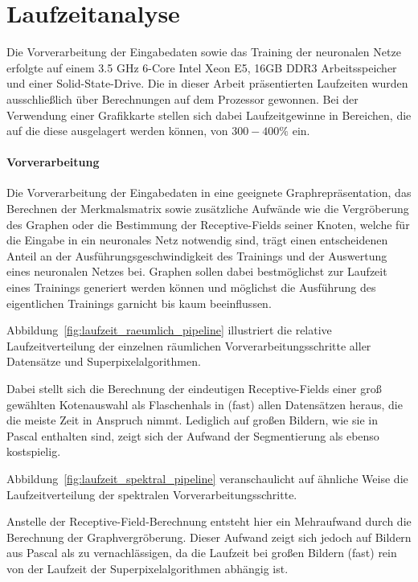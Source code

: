 \section{Laufzeitanalyse}
\label{laufzeitanalyse}

Die Vorverarbeitung der Eingabedaten sowie das Training der neuronalen Netze erfolgte auf einem 3.5 GHz 6-Core Intel Xeon E5, 16GB DDR3 Arbeitsspeicher und einer Solid-State-Drive.
Die in dieser Arbeit präsentierten Laufzeiten wurden ausschließlich über Berechnungen auf dem Prozessor gewonnen.
Bei der Verwendung einer Grafikkarte stellen sich dabei Laufzeitgewinne in Bereichen, die auf die diese ausgelagert werden können, von $300 - 400 \%$ ein.

\paragraph{Vorverarbeitung}

Die Vorverarbeitung der Eingabedaten in eine geeignete Graphrepräsentation, das Berechnen der Merkmalsmatrix sowie zusätzliche Aufwände wie die Vergröberung des Graphen oder die Bestimmung der Receptive-Fields seiner Knoten, welche für die Eingabe in ein neuronales Netz notwendig sind, trägt einen entscheidenen Anteil an der Ausführungsgeschwindigkeit des Trainings und der Auswertung eines neuronalen Netzes bei.
Graphen sollen dabei bestmöglichst zur Laufzeit eines Trainings generiert werden können und möglichst die Ausführung des eigentlichen Trainings garnicht bis kaum beeinflussen.

Abbildung~\ref{fig:laufzeit_raeumlich_pipeline} illustriert die relative Laufzeitverteilung der einzelnen räumlichen Vorverarbeitungsschritte \bzgl{} aller Datensätze und Superpixelalgorithmen.

Dabei stellt sich die Berechnung der eindeutigen Receptive-Fields einer groß gewählten Kotenauswahl als Flaschenhals in (fast) allen Datensätzen heraus, die die meiste Zeit in Anspruch nimmt.
Lediglich auf großen Bildern, wie sie in \gls{Pascal} enthalten sind, zeigt sich der Aufwand der Segmentierung als ebenso kostspielig.

Abbildung~\ref{fig:laufzeit_spektral_pipeline} veranschaulicht auf ähnliche Weise die Laufzeitverteilung der spektralen Vorverarbeitungsschritte.

Anstelle der Receptive-Field-Berechnung entsteht hier ein Mehraufwand durch die Berechnung der Graphvergröberung.
Dieser Aufwand zeigt sich jedoch auf Bildern aus \gls{Pascal} als zu vernachlässigen, da die Laufzeit bei großen Bildern (fast) rein von der Laufzeit der Superpixelalgorithmen abhängig ist.

